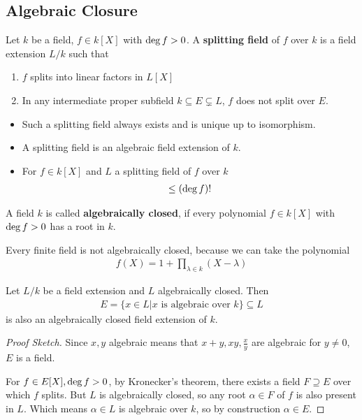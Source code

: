 \subsection{Algebraic Closure}

\begin{dfn}[]
  Let $k$ be a field, $f \in k[X]$ with $\operatorname{deg} f > 0$.
  A \textbf{splitting field} of $f$ over $k$ is a field extension $L/k$ such that
  \begin{enumerate}
    \item $f$ splits into linear factors in $L[X]$
    \item In any intermediate proper subfield $k \subseteq E \subsetneq L$, $f$ does not split over $E$.
  \end{enumerate}
\end{dfn}
\begin{itemize}
  \item Such a splitting field always exists and is unique up to isomorphism.
  \item A splitting field is an algebraic field extension of $k$.
  \item For $f \in k[X]$ and $L$ a splitting field of $f$ over $k$
    \begin{align*}
      [L:k] \leq (\degree f)!
    \end{align*}
\end{itemize}
\begin{dfn}[]
  A field $k$ is called \textbf{algebraically closed}, if every polynomial $f \in k[X]$ with $\operatorname{deg} f > 0$ has a root in $k$.
\end{dfn}
Every finite field is not algebraically closed, because we can take the polynomial
\begin{align*}
  f(X) = 1 + \prod_{\lambda \in k}(X - \lambda)
\end{align*}



\begin{prop}[]
  Let $L/k$ be a field extension and $L$ algebraically closed.
  Then
  \begin{align*}
    E = \{x \in L \big\vert x \text{ is algebraic over }k\} \subseteq L
  \end{align*}
  is also an algebraically closed field extension of $k$.
\end{prop}
\begin{proof}[Proof Sketch]
  Since $x,y$ algebraic means that $x+y,xy, \frac{x}{y}$ are algebraic for $y \neq 0$, $E$ is a field.

  For $f \in E[X], \operatorname{deg} f > 0$, by Kronecker's theorem, there exists a field $F \supseteq E$ over which $f$ splits.
  But $L$ is algebraically closed, so any root $\alpha \in F$ of $f$ is also present in $L$.
  Which means $\alpha \in L$ is algebraic over $k$, so by construction $\alpha \in E$.
\end{proof}

